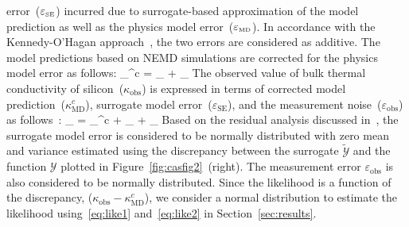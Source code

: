 error~($\varepsilon_\text{\tiny{SE}}$)
incurred due to surrogate-based approximation of the model prediction as well as the
physics model error~($\varepsilon_\text{\tiny{MD}}$).
In accordance with the Kennedy-O'Hagan approach~\cite{Kennedy:2001}, the two errors
are considered as additive. The model predictions based on NEMD simulations are
corrected for the physics model error as follows:
%
\be
\kappa_^c = \kappa_ + \varepsilon_
\label{eq:like1}
\ee
%
The observed value of bulk thermal conductivity of silicon~($\kappa_\text{obs}$) is expressed in
terms of corrected model prediction~($\kappa_\text{MD}^c$), surrogate model error~($\varepsilon_\text{SE}$),
and the measurement  noise~($\varepsilon_\text{obs}$) as follows~\cite{Liang:2011,Nannapaneni:2016}:
%
\be
\kappa_ = \kappa_^c + \varepsilon_ + \varepsilon_
\label{eq:like2}
\ee
%
Based on the residual analysis discussed in~\cite{Haldar:2000}, the surrogate model error is considered to 
be normally distributed with zero mean and variance estimated using the discrepancy between
the surrogate $\tilde{\mathcal{Y}}$ and the function $\mathcal{Y}$ plotted in 
Figure~\ref{fig:casfig2}~(right). The measurement error $\varepsilon_\text{obs}$ is also
considered to be normally distributed. Since the likelihood is a function of the discrepancy,
($\kappa_\text{obs} - \kappa_\text{MD}^c$), we consider a normal distribution to 
estimate the likelihood using~\eqref{eq:like1} and~\eqref{eq:like2} in Section~\ref{sec:results}.


